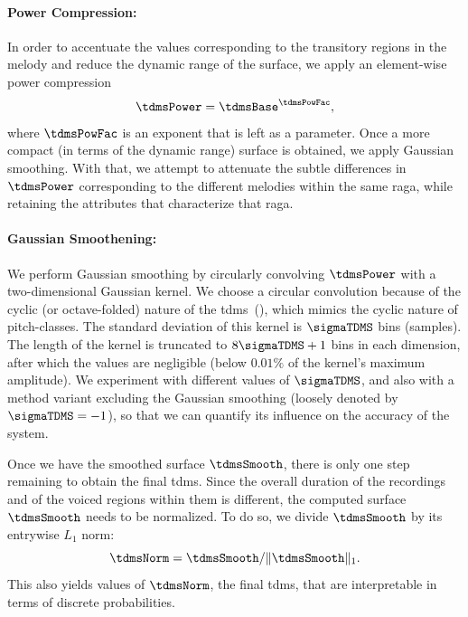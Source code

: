\paragraph{Power Compression:} In order to accentuate the values corresponding to the transitory regions in the melody and reduce the dynamic range of the surface, we apply an element-wise power compression
\begin{equation}
\label{eq:tdms_power_compression}	
\tdmsPower= \tdmsBase^\tdmsPowFac ,
\end{equation}
where $\tdmsPowFac$ is an exponent that is left as a parameter. Once a more compact (in terms of the dynamic range) surface is obtained, we apply Gaussian smoothing. With that, we attempt to attenuate the subtle differences in $\tdmsPower$ corresponding to the different melodies within the same \gls{raga}, while retaining the attributes that characterize that \gls{raga}. 

\paragraph{Gaussian Smoothening:} We perform Gaussian smoothing by circularly convolving $\tdmsPower$ with a two-dimensional Gaussian kernel. We choose a circular convolution because of the cyclic (or octave-folded) nature of the \gls{tdms}~(), which mimics the cyclic nature of pitch-classes. The standard deviation of this kernel is $\sigmaTDMS$ bins (samples). The length of the kernel is truncated to $8\sigmaTDMS + 1$ bins in each dimension, after which the values are negligible (below $0.01\%$ of the kernel's maximum amplitude). We experiment with different values of $\sigmaTDMS$, and also with a method variant excluding the Gaussian smoothing (loosely denoted by $\sigmaTDMS = -1$), so that we can quantify its influence on the accuracy of the system. 
%

Once we have the smoothed surface $\tdmsSmooth$, there is only one step remaining to obtain the final \gls{tdms}. Since the overall duration of the recordings and of the voiced regions within them is different, the computed surface $\tdmsSmooth$ needs to be normalized. To do so, we divide $\tdmsSmooth$ by its entrywise $L_1$ norm:
\begin{equation}
\label{eq:tdms_normalization}
\tdmsNorm = \tdmsSmooth/\norm{\tdmsSmooth}_{1} .
\end{equation}
This also yields values of $\tdmsNorm$, the final \gls{tdms}, that are interpretable in terms of discrete probabilities.

